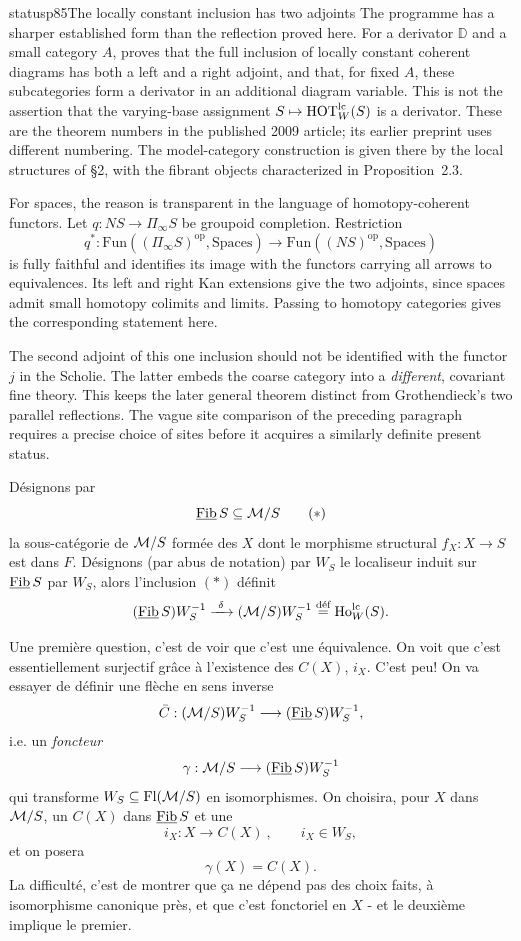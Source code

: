 \begin{dcomment}{status}{p85}{The locally constant inclusion has two adjoints}
The programme has a sharper established form than the reflection proved here. For a derivator $\mathbb D$ and a small category $A$, \citet[Proposition~3.10 and Theorem~3.13]{Cisinski2009LocallyConstant} proves that the full inclusion of locally constant coherent diagrams has both a left and a right adjoint, and that, for fixed $A$, these subcategories form a derivator in an additional diagram variable. This is not the assertion that the varying-base assignment $S\mapsto\mathrm{HOT}_W^{\mathrm{lc}}(S)$ is a derivator. These are the theorem numbers in the published 2009 article; its earlier preprint uses different numbering. The model-category construction is given there by the local structures of \S2, with the fibrant objects characterized in Proposition~2.3.

For spaces, the reason is transparent in the language of homotopy-coherent functors. Let $q:NS\to\Pi_\infty S$ be groupoid completion. Restriction
\[
 q^*:\mathrm{Fun}((\Pi_\infty S)^{\mathrm{op}},\mathrm{Spaces})
       \longrightarrow\mathrm{Fun}((NS)^{\mathrm{op}},\mathrm{Spaces})
\]
is fully faithful and identifies its image with the functors carrying all arrows to equivalences. Its left and right Kan extensions give the two adjoints, since spaces admit small homotopy colimits and limits. Passing to homotopy categories gives the corresponding statement here.

The second adjoint of this one inclusion should not be identified with the functor $j$ in the Scholie. The latter embeds the coarse category into a \emph{different}, covariant fine theory. This keeps the later general theorem distinct from Grothendieck's two parallel reflections. The vague site comparison of the preceding paragraph requires a precise choice of sites before it acquires a similarly definite present status.
\end{dcomment}


Désignons par
\[
\Fib S\subseteq\cM/S \tag*{$(*)$}
\]
la sous-catégorie de $\mathcal{M}/S$ formée des $X$ dont le morphisme structural $f_X:X\longrightarrow S$ est
dans $F$. Désignons (par abus de notation) par $W_S$ le localiseur induit sur $\underline{\mathrm{Fib}}\, S$ par $W_S$,
alors l'inclusion $(*)$ définit
\[
(\Fib S)W_S^{-1}\xrightarrow{\ \delta\ }(\cM/S)W_S^{-1}\overset{\text{déf}}{=}\Ho^{\mathrm{lc}}_W(S).
\]

Une première question, c'est de voir que c'est une équivalence. On voit que c'est essentiellement
surjectif grâce à l'existence des $C(X)$, $i_X$. C'est peu! On va essayer de définir
une flèche en sens inverse
\[
\bar{C}:(\mathcal{M}/S)W_S^{-1}\longrightarrow(\underline{\mathrm{Fib}}\, S)W_S^{-1},
\]
i.e. un \textit{foncteur}
\[
\gamma:\mathcal{M}/S\longrightarrow(\underline{\mathrm{Fib}}\, S)W_S^{-1}
\]
qui transforme $W_S\subseteq\mathrm{Fl}(\mathcal{M}/S)$ en isomorphismes. On choisira, pour $X$ dans $\mathcal{M}/S$, un
$C(X)$ dans $\underline{\mathrm{Fib}}\, S$ et une
\[
i_X:X\longrightarrow C(X)\ , \qquad i_X\in W_S,
\]
et on posera
\[
\gamma(X)=C(X).
\]
La difficulté, c'est de montrer que ça ne dépend pas des choix faits, à isomorphisme
canonique près, et que c'est fonctoriel en $X$ - et le deuxième implique le premier.

